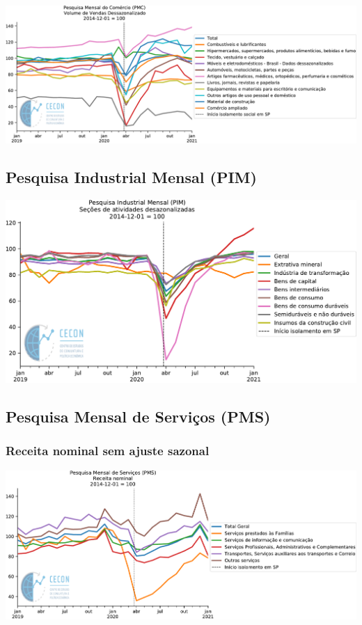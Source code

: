 \documentclass{SelfArx}
\begin{document}
\begin{center}
\includegraphics[width=.9\linewidth]{./figs/Setoriais/PMC_IBGE.pdf}
\end{center}


\subsection*{Pesquisa Industrial Mensal (PIM)}
\label{sec:org5d6e083}

\begin{center}
\includegraphics[width=.9\linewidth]{./figs/Setoriais/PIM_IBGE.pdf}
\end{center}


\subsection*{Pesquisa Mensal de Serviços (PMS)}
\label{sec:orga5c1b55}
\subsubsection*{Receita nominal sem ajuste sazonal}
\label{sec:org0739c64}
\begin{center}
\includegraphics[width=.9\linewidth]{./figs/Setoriais/PMS_IBGE.pdf}
\end{center}
\end{document}
